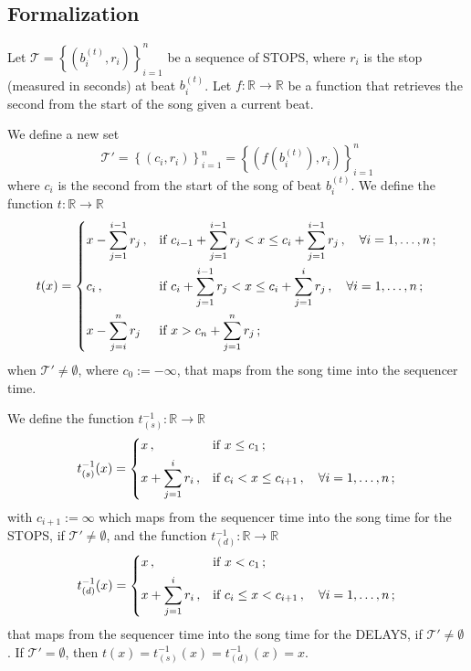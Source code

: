 \documentclass[a4paper,9pt]{article}
\begin{document}
\subsection{Formalization}


Let $ \mathcal{T} =  \left\{\left( b_i^{(t)}, r_i \right)\right\}_{i=1}^{n} $ be a sequence of STOPS, where $ r_i $ is the stop (measured in seconds) at beat $ b_i^{(t)} $. Let $ f:\mathbb{R}\rightarrow \mathbb{R} $ be a function that retrieves the second from the start of the song given a current beat.

We define a new set 
\begin{equation}
	\mathcal{T'} = \left\{\left( c_i, r_i \right)\right\}_{i=1}^{n} = \left\{\left( f\left( b_i^{(t)}\right), r_i \right)\right\}_{i=1}^{n}
	\label{eq:tprimeset}
\end{equation}
where $ c_i $ is the second from the start of the song of beat $ b_i^{(t)} $.
We define the function $ t: \mathbb{R}\rightarrow \mathbb{R} $
\begin{equation}
	t(x) = \begin{dcases}
		x - \sum_{j=1}^{i-1}r_j\,, & \text{if $ c_{i-1} + \sum_{j=1}^{i-1}r_j < x \leq c_i + \sum_{j=1}^{i-1}r_j\,, \quad \forall i=1,\dots,n$}\,;\\
		c_i\,, & \text{if $ c_i + \sum_{j=1}^{i-1}r_j < x \leq c_i + \sum_{j=1}^i r_j\,,\quad \forall i=1,\dots,n $}\,;\\
		x - \sum_{j=i}^n r_j & \text{if $ x > c_n + \sum_{j=1}^n r_j $}\,; 
	\end{dcases}
	\label{eq:t}
\end{equation}
when $ \mathcal{T'} \neq \emptyset $, where $ c_0 := -\infty $,  that maps from the song time into the sequencer time. 

We define the function $ t_{(s)}^{-1}: \mathbb{R}\rightarrow \mathbb{R} $
\begin{equation}
	t_{(s)}^{-1}(x) = \begin{dcases}
		x\,, & \text{if $ x \leq c_1 $}\,;\\
		x+ \sum_{j=1}^{i}r_i\,, & \text{if $ c_i < x \leq c_{i+1}\,,\quad \forall i=1,\dots,n$}\,;\\
	\end{dcases}
	\label{eq:t-1s}
\end{equation}
with $ c_{i+1} := \infty $ which maps from the sequencer time into the song time for the STOPS, if $ \mathcal{T'} \neq \emptyset $, and the function $ t_{(d)}^{-1}: \mathbb{R}\rightarrow \mathbb{R} $
\begin{equation}
	t_{(d)}^{-1}(x) = \begin{dcases}
		x\,, & \text{if $ x < c_1 $}\,;\\
		x+ \sum_{j=1}^{i}r_i\,, & \text{if $ c_i \leq x < c_{i+1}\,,\quad \forall i=1,\dots,n$}\,;\\
	\end{dcases}
	\label{eq:t-1s}
\end{equation}
that maps from the sequencer time into the song time for the DELAYS, if $ \mathcal{T'}\neq \emptyset $. If $ \mathcal{T'} = \emptyset $, then $ t(x) = t_{(s)}^{-1}(x) = t_{(d)}^{-1} (x) = x $.
\end{document}
